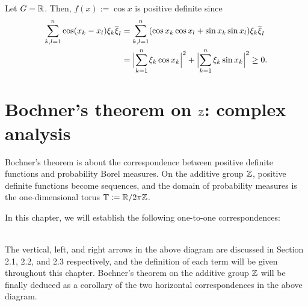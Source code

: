\documentclass{../../small}
\begin{document}
\begin{ex}
Let $G=\R$.
Then, $f(x):=\cos x$ is positive definite since
\begin{align*}
\sum_{k,l=1}^n\cos(x_k-x_l)\xi_k\bar\xi_l
&=\sum_{k,l=1}^n(\cos x_k\cos x_l+\sin x_k\sin x_l)\xi_k\bar\xi_l\\
&=\Bigl|\sum_{k=1}^n\xi_k\cos x_k\Bigr|^2+\Bigl|\sum_{k=1}^n\xi_k\sin x_k\Bigr|^2\ge0.
\end{align*}
\end{ex}




\newpage
\section{Bochner's theorem on $\Z$: complex analysis}

Bochner's theorem is about the correspondence between positive definite functions and probability Borel measures.
On the additive group $\Z$, positive definite functions become sequences, and the domain of probability measures is the one-dimensional torus $\T:=\R/2\pi\Z$.

In this chapter, we will establish the following one-to-one correspondences:
\begin{figure}[h]
\centering
{}
\end{figure}\\
The vertical, left, and right arrows in the above diagram are discussed in Section 2.1, 2.2, and 2.3 respectively, and the definition of each term will be given throughout this chapter.
Bochner's theorem on the additive group $\Z$ will be finally deduced as a corollary of the two horizontal correspondences in the above diagram.
\end{document}
